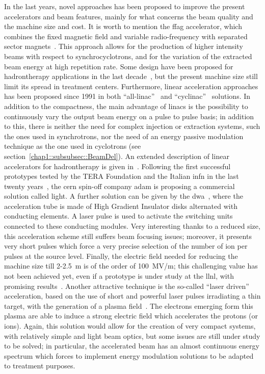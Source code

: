 In the last years, novel approaches has been proposed  to improve the present accelerators and beam features, mainly for what concerns the beam quality and the machine size and cost. It is worth to mention the \gls{ffag} accelerator, which combines the fixed magnetic field and variable radio-frequency with separated sector magnets~\parencite{Sheehy2016}. This approach allows for the production of higher intensity beams with respect to synchrocyclotrons, and for the variation of the extracted beam energy at high repetition rate. Some design have been proposed for hadrontherapy applications in the last decade~\parencite{Antoine2009, Peach2010}, but the present machine size still limit its spread in treatment centers. 
Furthermore, linear acceleration approaches has been proposed since 1991 in both \enquote{all-linac}~\parencite{Lennox1991, Hamm1991} and \enquote{cyclinac}~\parencite{Amaldi2009b} solutions. In addition to the compactness, the main advantage of linacs is the possibility to continuously vary the output beam energy on a pulse to pulse basis; in addition to this, there is neither the need for complex injection or extraction systems, such the ones used in synchrotrons, nor the need of an energy passive modulation technique as the one used in cyclotrons (see section~\ref{chap1::subsubsec::BeamDel}). An extended description of linear accelerators for hadrontherapy is given in~\cite{Amaldi2009a}. Following the first successful prototypes tested by the TERA Foundation and the Italian \gls{infn} in the last twenty years~\parencite{Amaldi2004, Ronsivalle2011}, the \gls{cern} spin-off company \gls{adam} is proposing a commercial solution called \gls{light}. A further solution can be given by the \gls{dwa}~\parencite{Caporaso2009}, where the acceleration tube is made of High Gradient Insulator disks alternated with conducting elements. A laser pulse is used to activate the switching units connected to these conducting modules. Very interesting thanks to a reduced size, this acceleration scheme still suffers beam focusing issues; moreover, it presents very short pulses which force a very precise selection of the number of ion per pulses at the source level. Finally, the electric field needed for reducing the machine size till 2-2.5~m is of the order of 100~MV/m; this challenging value has not been achieved yet, even if a prototype is under study at the \gls{llnl}, with promising results~\parencite{Zografos2013}.  Another attractive technique is the so-called \enquote{laser driven} acceleration,  based on the use of short and powerful laser pulses irradiating a thin target, with the generation of a plasma field~\parencite{Tajima2009}. The electrons emerging form this plasma are able to induce a strong electric field which accelerates the protons (or ions). Again, this solution would allow for the creation of very compact systems, with relatively simple and light beam optics, but some issues are still under study to be solved; in particular, the accelerated beam has an almost continuous energy spectrum which forces to implement energy modulation solutions to be adapted to treatment purposes. 

